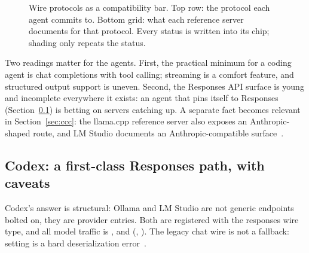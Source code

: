 \documentclass{article}
\newcommand{\codex}[0]{Codex}
\begin{document}
\begin{figure}[t]
\caption{Wire protocols as a compatibility bar. Top row: the protocol each
agent commits to. Bottom grid: what each reference server documents for
that protocol. Every status is written into its chip; shading only
repeats the status.}
\label{fig:protocolbar}
\end{figure}

Two readings matter for the agents. First, the practical minimum for a
coding agent is chat completions with tool calling; streaming is a
comfort feature, and structured output support is uneven. Second, the
Responses API surface is young and incomplete everywhere it exists: an
agent that pins itself to Responses (Section~\ref{sec:codex}) is betting
on servers catching up. A separate fact becomes relevant in
Section~\ref{sec:ccc}: the llama.cpp reference server also exposes an
Anthropic-shaped  route, and LM Studio documents an
Anthropic-compatible surface~\citep{llamaCppServerDocs,lmstudioApiDocs}.

\subsection{Codex: a first-class Responses path, with caveats}
\label{sec:codex}

\codex{}'s answer is structural: Ollama and LM Studio are not generic
endpoints bolted on, they are provider entries. Both are registered with
the responses wire type, and all model traffic is
, 
and 
(,
). The
legacy chat wire is not a fallback: setting  is a
hard deserialization error~\citep{codexRepo}.
\end{document}
